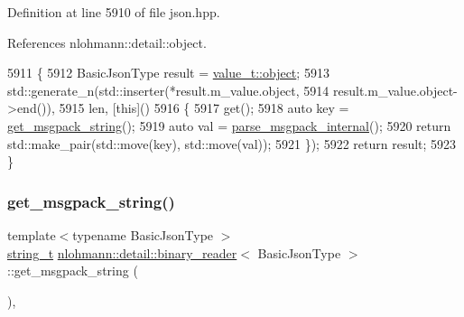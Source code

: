 Definition at line 5910 of file json.\+hpp.



References nlohmann\+::detail\+::object.


\begin{DoxyCode}
5911     \{
5912         BasicJsonType result = \hyperlink{namespacenlohmann_1_1detail_a1ed8fc6239da25abcaf681d30ace4985aa8cfde6331bd59eb2ac96f8911c4b666}{value\_t::object};
5913         std::generate\_n(std::inserter(*result.m\_value.object,
5914                                       result.m\_value.object->end()),
5915                         len, [\textcolor{keyword}{this}]()
5916         \{
5917             \textcolor{keyword}{get}();
5918             \textcolor{keyword}{auto} key = \hyperlink{classnlohmann_1_1detail_1_1binary__reader_aca08d17b5a8230eb6738628934b3b5a5}{get\_msgpack\_string}();
5919             \textcolor{keyword}{auto} val = \hyperlink{classnlohmann_1_1detail_1_1binary__reader_ac6dc6270ddddd0aac65fe6cab53d7cc2}{parse\_msgpack\_internal}();
5920             \textcolor{keywordflow}{return} std::make\_pair(std::move(key), std::move(val));
5921         \});
5922         \textcolor{keywordflow}{return} result;
5923     \}
\end{DoxyCode}
\mbox{\label{classnlohmann_1_1detail_1_1binary__reader_aca08d17b5a8230eb6738628934b3b5a5}} 
\subsubsection{\texorpdfstring{get\+\_\+msgpack\+\_\+string()}{get\_msgpack\_string()}}
{\footnotesize\ttfamily template$<$typename Basic\+Json\+Type $>$ \\
\hyperlink{classnlohmann_1_1detail_1_1binary__reader_a889a8702ca8aa45e99136bc31ea898e9}{string\+\_\+t} \hyperlink{classnlohmann_1_1detail_1_1binary__reader}{nlohmann\+::detail\+::binary\+\_\+reader}$<$ Basic\+Json\+Type $>$\+::get\+\_\+msgpack\+\_\+string (\begin{DoxyParamCaption}{ }\end{DoxyParamCaption})\hspace{0.3cm}{\ttfamily [inline]}, {\ttfamily [private]}}



